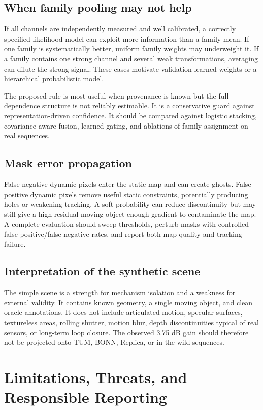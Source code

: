 \documentclass[10pt,conference]{IEEEtran}
\begin{document}
\subsection{When family pooling may not help}
If all channels are independently measured and well calibrated, a correctly specified likelihood model can exploit more information than a family mean. If one family is systematically better, uniform family weights may underweight it. If a family contains one strong channel and several weak transformations, averaging can dilute the strong signal. These cases motivate validation-learned weights or a hierarchical probabilistic model.

The proposed rule is most useful when provenance is known but the full dependence structure is not reliably estimable. It is a conservative guard against representation-driven confidence. It should be compared against logistic stacking, covariance-aware fusion, learned gating, and ablations of family assignment on real sequences.

\subsection{Mask error propagation}
False-negative dynamic pixels enter the static map and can create ghosts. False-positive dynamic pixels remove useful static constraints, potentially producing holes or weakening tracking. A soft probability can reduce discontinuity but may still give a high-residual moving object enough gradient to contaminate the map. A complete evaluation should sweep thresholds, perturb masks with controlled false-positive/false-negative rates, and report both map quality and tracking failure.

\subsection{Interpretation of the synthetic scene}
The simple scene is a strength for mechanism isolation and a weakness for external validity. It contains known geometry, a single moving object, and clean oracle annotations. It does not include articulated motion, specular surfaces, textureless areas, rolling shutter, motion blur, depth discontinuities typical of real sensors, or long-term loop closure. The observed 3.75 dB gain should therefore not be projected onto TUM, BONN, Replica, or in-the-wild sequences.

\section{Limitations, Threats, and Responsible Reporting}
\end{document}
